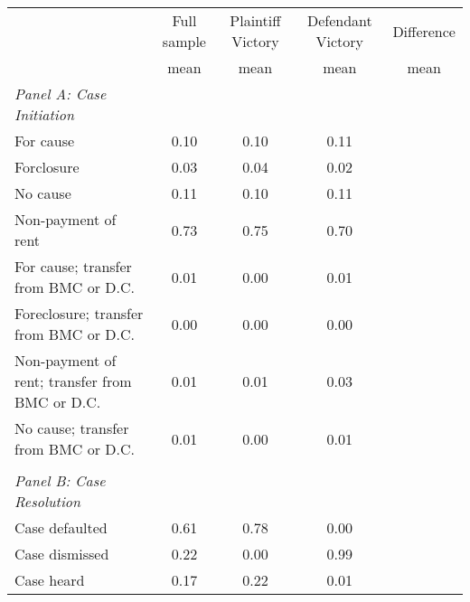 {
\def\sym#1{\ifmmode^{#1}\else\(^{#1}\)\fi}
\begin{tabular}{l*{4}{c}}
\toprule
                    &\multicolumn{1}{c}{Full sample}&\multicolumn{1}{c}{Plaintiff Victory}&\multicolumn{1}{c}{Defendant Victory}&\multicolumn{1}{c}{Difference}\\
                    &        mean&        mean&        mean&        mean\\
\midrule
\emph{Panel A: Case Initiation}&            &            &            &            \\
\hspace{0.25cm}For cause&        0.10&        0.10&        0.11&            \\
\hspace{0.25cm}Forclosure&        0.03&        0.04&        0.02&            \\
\hspace{0.25cm}No cause&        0.11&        0.10&        0.11&            \\
\hspace{0.25cm}Non-payment of rent&        0.73&        0.75&        0.70&            \\
\hspace{0.25cm}For cause; transfer from BMC or D.C.&        0.01&        0.00&        0.01&            \\
\hspace{0.25cm}Foreclosure; transfer from BMC or D.C.&        0.00&        0.00&        0.00&            \\
\hspace{0.25cm}Non-payment of rent; transfer from BMC or D.C.&        0.01&        0.01&        0.03&            \\
\hspace{0.25cm}No cause; transfer from BMC or D.C.&        0.01&        0.00&        0.01&            \\
\vspace{0.1em} \\ \emph{Panel B: Case Resolution}&            &            &            &            \\
\hspace{0.25cm}Case defaulted&        0.61&        0.78&        0.00&            \\
\hspace{0.25cm}Case dismissed&        0.22&        0.00&        0.99&            \\
\hspace{0.25cm}Case heard&        0.17&        0.22&        0.01&            \\

\end{tabular}}
